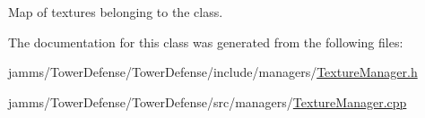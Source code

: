 Map of textures belonging to the class. 



The documentation for this class was generated from the following files\+:\begin{DoxyCompactItemize}
\item 
jamms/\+Tower\+Defense/\+Tower\+Defense/include/managers/\hyperlink{_texture_manager_8h}{Texture\+Manager.\+h}\item 
jamms/\+Tower\+Defense/\+Tower\+Defense/src/managers/\hyperlink{_texture_manager_8cpp}{Texture\+Manager.\+cpp}\end{DoxyCompactItemize}
